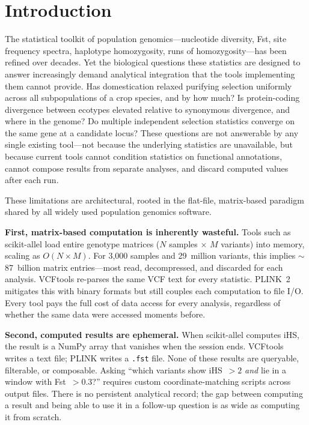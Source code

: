 \section*{Introduction}

The statistical toolkit of population genomics---nucleotide diversity, Fst, site frequency spectra, haplotype homozygosity, runs of homozygosity---has been refined over decades. Yet the biological questions these statistics are designed to answer increasingly demand analytical integration that the tools implementing them cannot provide. Has domestication relaxed purifying selection uniformly across all subpopulations of a crop species, and by how much? Is protein-coding divergence between ecotypes elevated relative to synonymous divergence, and where in the genome? Do multiple independent selection statistics converge on the same gene at a candidate locus? These questions are not answerable by any single existing tool---not because the underlying statistics are unavailable, but because current tools cannot condition statistics on functional annotations, cannot compose results from separate analyses, and discard computed values after each run.

These limitations are architectural, rooted in the flat-file, matrix-based paradigm shared by all widely used population genomics software.

\textbf{First, matrix-based computation is inherently wasteful.} Tools such as scikit-allel\cite{miles2024scikit} load entire genotype matrices ($N$ samples $\times$ $M$ variants) into memory, scaling as $O(N \times M)$. For 3{,}000 samples and 29~million variants, this implies $\sim$87~billion matrix entries---most read, decompressed, and discarded for each analysis. VCFtools\cite{danecek2011variant} re-parses the same VCF text for every statistic. PLINK~2\cite{chang2015second} mitigates this with binary formats but still couples each computation to file I/O. Every tool pays the full cost of data access for every analysis, regardless of whether the same data were accessed moments before.

\textbf{Second, computed results are ephemeral.} When scikit-allel computes iHS, the result is a NumPy array that vanishes when the session ends. VCFtools writes a text file; PLINK writes a \texttt{.fst} file. None of these results are queryable, filterable, or composable. Asking ``which variants show iHS~$> 2$ \emph{and} lie in a window with Fst~$> 0.3$?'' requires custom coordinate-matching scripts across output files. There is no persistent analytical record; the gap between computing a result and being able to use it in a follow-up question is as wide as computing it from scratch.

